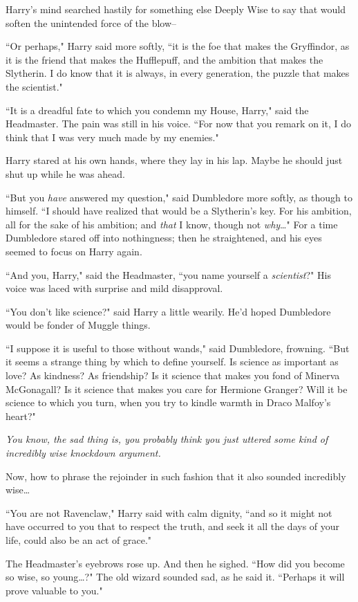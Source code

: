 Harry's mind searched hastily for something else Deeply Wise to say that would soften the unintended force of the blow\---

``Or perhaps," Harry said more softly, ``it is the foe that makes the Gryffindor, as it is the friend that makes the Hufflepuff, and the ambition that makes the Slytherin. I do know that it is always, in every generation, the puzzle that makes the scientist."

``It is a dreadful fate to which you condemn my House, Harry," said the Headmaster. The pain was still in his voice. ``For now that you remark on it, I do think that I was very much made by my enemies."

Harry stared at his own hands, where they lay in his lap. Maybe he should just shut up while he was ahead.

``But you \emph{have} answered my question," said Dumbledore more softly, as though to himself. ``I should have realized that would be a Slytherin's key. For his ambition, all for the sake of his ambition; and \emph{that} I know, though not \emph{why}{\ldots}" For a time Dumbledore stared off into nothingness; then he straightened, and his eyes seemed to focus on Harry again.

``And you, Harry," said the Headmaster, ``you name yourself a \emph{scientist}?" His voice was laced with surprise and mild disapproval.

``You don't like science?" said Harry a little wearily. He'd hoped Dumbledore would be fonder of Muggle things.

``I suppose it is useful to those without wands," said Dumbledore, frowning. ``But it seems a strange thing by which to define yourself. Is science as important as love? As kindness? As friendship? Is it science that makes you fond of Minerva McGonagall? Is it science that makes you care for Hermione Granger? Will it be science to which you turn, when you try to kindle warmth in Draco Malfoy's heart?"

\emph{You know, the sad thing is, you probably think you just uttered some kind of incredibly wise knockdown argument.}

Now, how to phrase the rejoinder in such fashion that it also sounded incredibly wise{\ldots}

``You are not Ravenclaw," Harry said with calm dignity, ``and so it might not have occurred to you that to respect the truth, and seek it all the days of your life, could also be an act of grace."

The Headmaster's eyebrows rose up. And then he sighed. ``How did you become so wise, so young{\ldots}?" The old wizard sounded sad, as he said it. ``Perhaps it will prove valuable to you."

